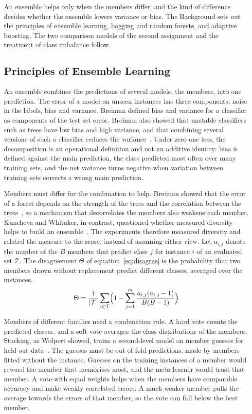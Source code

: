 \documentclass[10pt,conference]{IEEEtran}
\begin{document}
An ensemble helps only when the members differ, and the kind of difference decides whether the ensemble lowers variance or bias. The Background sets out the principles of ensemble learning, bagging and random forests, and adaptive boosting. The two comparison models of the second assignment and the treatment of class imbalance follow.

\subsection{Principles of Ensemble Learning}
\label{sec:bg-principles}

An ensemble combines the predictions of several models, the members, into one prediction. The error of a model on unseen instances has three components: noise in the labels, bias and variance. Breiman defined bias and variance for a classifier as components of the test set error. Breiman also showed that unstable classifiers such as trees have low bias and high variance, and that combining several versions of such a classifier reduces the variance~\cite{breiman1998}. Under zero-one loss, the decomposition is an operational definition and not an additive identity: bias is defined against the main prediction, the class predicted most often over many training sets, and the net variance turns negative when variation between training sets corrects a wrong main prediction.

Members must differ for the combination to help. Breiman showed that the error of a forest depends on the strength of the trees and the correlation between the trees~\cite{breiman2001}, so a mechanism that decorrelates the members also weakens each member. Kuncheva and Whitaker, in contrast, questioned whether measured diversity helps to build an ensemble~\cite{kuncheva2003}. The experiments therefore measured diversity and related the measure to the score, instead of assuming either view. Let $a_{i,j}$ denote the number of the $B$ members that predict class $j$ for instance $i$ of an evaluated set $\mathcal{T}$. The disagreement $\Theta$ of equation~\eqref{eq:disagree} is the probability that two members drawn without replacement predict different classes, averaged over the instances.
\begin{equation}
\label{eq:disagree}
\Theta = \frac{1}{|\mathcal{T}|} \sum_{i \in \mathcal{T}} \Bigl( 1 - \sum_{j=1}^{m} \frac{a_{i,j} (a_{i,j} - 1)}{B (B - 1)} \Bigr)
\end{equation}

Members of different families need a combination rule. A hard vote counts the predicted classes, and a soft vote averages the class distributions of the members. Stacking, as Wolpert showed, trains a second-level model on member guesses for held-out data~\cite{wolpert1992}. The guesses must be out-of-fold predictions, made by members fitted without the instance. Guesses on the training instances of a member would reward the member that memorises most, and the meta-learner would trust that member. A vote with equal weights helps when the members have comparable accuracy and make weakly correlated errors. A much weaker member pulls the average towards the errors of that member, so the vote can fall below the best member.
\end{document}
